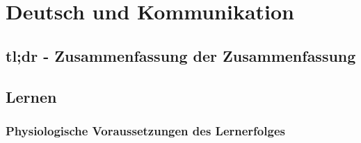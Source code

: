 \section{Deutsch und Kommunikation}


\subsection{tl;dr - Zusammenfassung der Zusammenfassung}

\subsection{Lernen}


\subsubsection{Physiologische Voraussetzungen des Lernerfolges}

